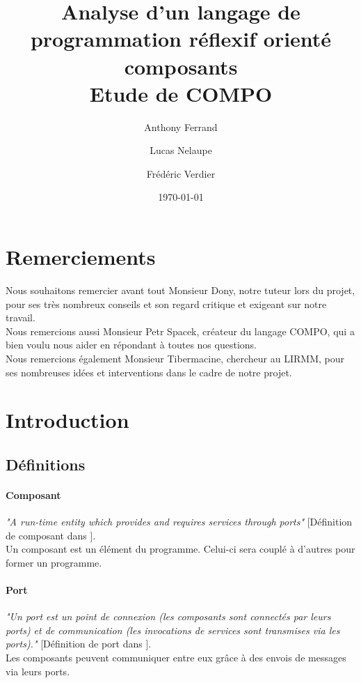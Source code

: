 \documentclass[11pt,a4paper,openany,oneside]{book}
\title{Analyse d'un langage de programmation réflexif orienté composants \\ Etude de COMPO}
\author{Anthony Ferrand \and Lucas Nelaupe \and Frédéric Verdier}
\date\today
\begin{document}
\maketitle

\chapter*{Remerciements}

Nous souhaitons remercier avant tout Monsieur Dony, notre tuteur lors du projet, pour ses très nombreux conseils et son regard critique et exigeant sur notre travail.\\
Nous remercions aussi Monsieur Petr Spacek, créateur du langage COMPO, qui a bien voulu nous aider en répondant à toutes nos questions. \\
Nous remercions également Monsieur Tibermacine, chercheur au LIRMM, pour ses nombreuses idées et interventions dans le cadre de notre projet.\\



\tableofcontents

\chapter{Introduction}

\section{Définitions}

\subsubsection{Composant}

\textit{"A run-time entity which provides and requires services through ports"} [Définition de composant dans \citep{these}].\\
Un composant est un élément du programme. Celui-ci sera couplé à d'autres pour former un programme.
\subsubsection{Port}

\textit{"Un port est un point de connexion (les composants sont connectés par leurs ports) et de communication (les invocations de services sont transmises via les ports)."} [Définition de port dans \citep{articleToRead}].\\
Les composants peuvent communiquer entre eux grâce à des envois de messages via leurs ports.
\end{document}
